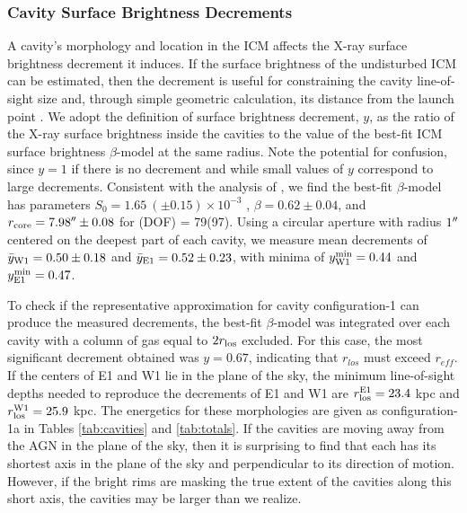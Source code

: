 \documentclass[apjpt4]{aastex}
\begin{document}
\subsubsection{Cavity Surface Brightness Decrements}
\label{sec:dec}

A cavity's morphology and location in the ICM affects the X-ray
surface brightness decrement it induces. If the surface brightness of
the undisturbed ICM can be estimated, then the decrement is useful for
constraining the cavity line-of-sight size and, through simple
geometric calculation, its distance from the launch point
\citep[see][for details]{hydraa}. We adopt the \citet{hydraa}
definition of surface brightness decrement, $y$, as the ratio of the
X-ray surface brightness inside the cavities to the value of the
best-fit ICM surface brightness $\beta$-model at the same radius. Note
the potential for confusion, since $y=1$ if there is no decrement and
while small values of $y$ correspond to large decrements. Consistent
with the analysis of \citet{schindler01}, we find the best-fit
$\beta$-model has parameters $S_0 = 1.65 ~(\pm 0.15) \times 10^{-3}$
\sbr, $\beta = 0.62 \pm 0.04$, and $r_{\rm{core}} = 7.98\rm{^\prime}\hskip -0.1em\rm{^\prime} \pm
0.08$ for \chisq(DOF) = 79(97). Using a circular aperture with radius
$1\rm{^\prime}\hskip -0.1em\rm{^\prime}$ centered on the deepest part of each cavity, we measure mean
decrements of $\bar{y}_{\rm{W1}} = 0.50 \pm 0.18$ and
$\bar{y}_{\rm{E1}} = 0.52 \pm 0.23$, with minima of
$y^{\rm{min}}_{\rm{W1}} = 0.44$ and $y^{\rm{min}}_{\rm{E1}} = 0.47$.

To check if the representative approximation for cavity
configuration-1 can produce the measured decrements, the best-fit
$\beta$-model was integrated over each cavity with a column of gas
equal to $2r_{\rm{los}}$ excluded. For this case, the most significant
decrement obtained was $y = 0.67$, indicating that $r_{los}$ must
exceed $r_{eff}$. If the centers of E1 and W1 lie in the plane of the
sky, the minimum line-of-sight depths needed to reproduce the
decrements of E1 and W1 are $r_{\rm{los}}^{\rm{E1}} = 23.4$ kpc and
$r_{\rm{los}}^{\rm{W1}} = 25.9$ kpc. The energetics for these morphologies
are given as configuration-1a in Tables \ref{tab:cavities} and
\ref{tab:totals}. If the cavities are moving away from the AGN in the
plane of the sky, then it is surprising to find that each has its
shortest axis in the plane of the sky and perpendicular to its
direction of motion. However, if the bright rims are masking the true
extent of the cavities along this short axis, the cavities may be
larger than we realize.
\end{document}
